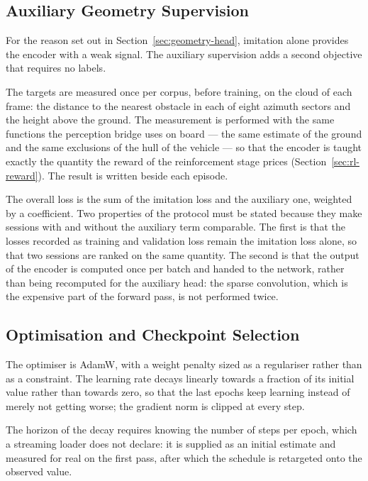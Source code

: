 \subsection{Auxiliary Geometry Supervision}
\label{sec:sl-geometry}

For the reason set out in Section~\ref{sec:geometry-head}, imitation alone
provides the encoder with a weak signal. The auxiliary supervision adds a second
objective that requires no labels.

The targets are measured once per corpus, before training, on the cloud of each
frame: the distance to the nearest obstacle in each of eight azimuth sectors and
the height above the ground. The measurement is performed with the same
functions the perception bridge uses on board --- the same estimate of the
ground and the same exclusions of the hull of the vehicle --- so that the
encoder is taught exactly the quantity the reward of the reinforcement stage
prices (Section~\ref{sec:rl-reward}). The result is written beside each episode.

The overall loss is the sum of the imitation loss and the auxiliary one,
weighted by a coefficient. Two properties of the protocol must be stated because
they make sessions with and without the auxiliary term comparable. The first is
that the losses recorded as training and validation loss remain the imitation
loss alone, so that two sessions are ranked on the same quantity. The second is
that the output of the encoder is computed once per batch and handed to the
network, rather than being recomputed for the auxiliary head: the sparse
convolution, which is the expensive part of the forward pass, is not performed
twice.

\subsection{Optimisation and Checkpoint Selection}
\label{sec:sl-optimisation}

The optimiser is AdamW, with a weight penalty sized as a regulariser rather than
as a constraint. The learning rate decays linearly towards a fraction of its
initial value rather than towards zero, so that the last epochs keep learning
instead of merely not getting worse; the gradient norm is clipped at every step.

The horizon of the decay requires knowing the number of steps per epoch, which a
streaming loader does not declare: it is supplied as an initial estimate and
measured for real on the first pass, after which the schedule is retargeted onto
the observed value.

